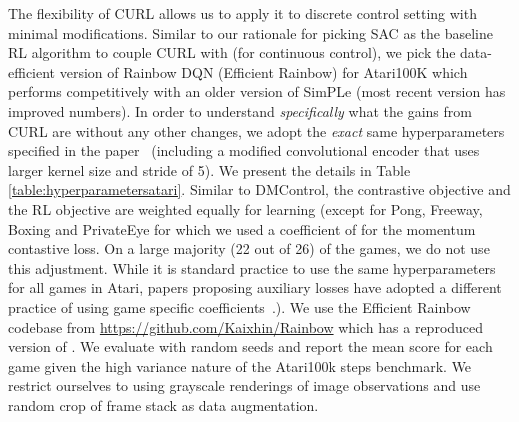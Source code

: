 \documentclass{article}
\begin{document}
The flexibility of CURL allows us to apply it to discrete control setting with minimal modifications. Similar to our rationale for picking SAC as the baseline RL algorithm to couple CURL with (for continuous control), we pick the data-efficient version of Rainbow DQN (Efficient Rainbow) \cite{van2019use} for Atari100K which performs competitively with an older version of SimPLe (most recent version has improved numbers). In order to understand {\it specifically} what the gains from CURL are without any other changes, we adopt the {\it exact} same hyperparameters specified in the paper~\cite{van2019use} (including a modified convolutional encoder that uses larger kernel size and stride of 5). We present the details in Table \ref{table:hyperparametersatari}. Similar to DMControl, the contrastive objective and the RL objective are weighted equally for learning (except for Pong, Freeway, Boxing and PrivateEye for which we used a coefficient of  for the momentum contastive loss. On a large majority (22 out of 26) of the games, we do not use this adjustment. While it is standard practice to use the same hyperparameters for all games in Atari, papers proposing auxiliary losses have adopted a different practice of using game specific coefficients~\cite{jaderberg2016reinforcement}.). We use the Efficient Rainbow codebase from \url{https://github.com/Kaixhin/Rainbow} which has a reproduced version of \citet{van2019use}. We evaluate with  random seeds and report the mean score for each game given the high variance nature of the Atari100k steps benchmark. We restrict ourselves to using grayscale renderings of image observations and use random crop of frame stack as data augmentation.
\end{document}
